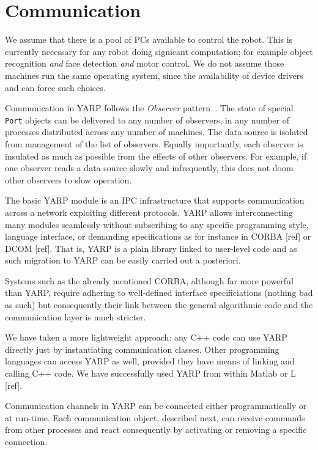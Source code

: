 \section{Communication}
\label{sec:communication}

We assume that there is a pool of PCs available to control the robot.
This is currently necessary for any robot doing signicant computation;
for example object recognition {\em and} face detection {\em and}
motor control.  We do not assume those machines run the same operating
system, since the availability of device drivers and
can force such choices.

Communication in YARP follows the {\em Observer} pattern~\cite{gamma95design}.  The state
of special {\tt Port} objects can be delivered to any number of
observers, in any number of processes distributed across any number of
machines.  The data source is isolated from management of the list
of observers.  Equally importantly, each observer is insulated as
much as possible from the effects of other observers.  For example,
if one observer reads a data source slowly and infrequently, this
does not doom other observers to slow operation.

The basic YARP module is an IPC infrastructure that supports communication across a
network exploiting different protocols. YARP allows interconnecting many modules
seamlessly without subscribing to any specific programming style, language interface, 
or demanding specifications as for instance in CORBA [ref] or DCOM [ref]. That is, YARP 
is a plain library linked to user-level code and as such migration to YARP can be easily
carried out a posteriori. 

Systems such as the already mentioned CORBA, although far more powerful than YARP, require 
adhering to well-defined interface specificiations (nothing bad as such) but consequently 
their link between the general algorithmic code and the communication layer is much 
stricter. 

We have taken a more lightweight approach: any C++ code can use YARP directly just by 
instantiating communication classes. Other programming languages can access YARP as well, 
provided they have means of linking and calling C++ code. We have successfully used YARP 
from within Matlab or L [ref].

Communication channels in YARP can be connected either programmatically or at run-time.
Each communication object, described next, can receive commands from other processes and 
react consequently by activating or removing a specific connection.

